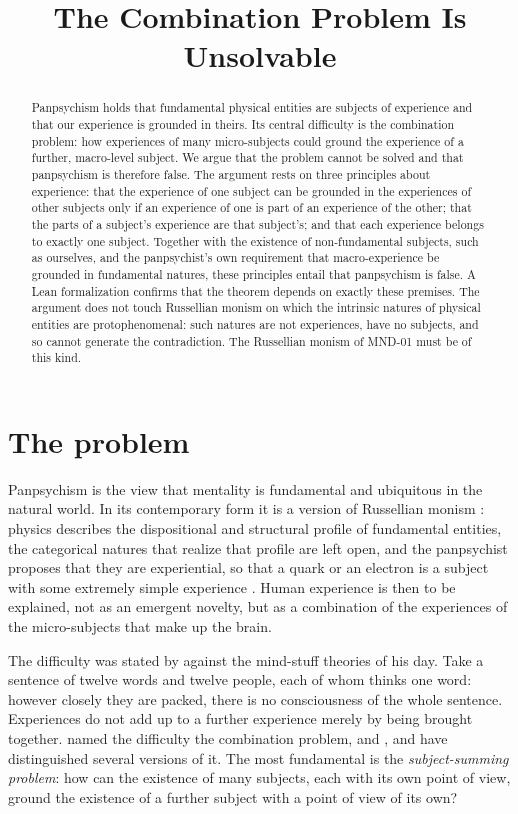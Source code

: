 \documentclass{situationist-preprint}
\title{The Combination Problem Is Unsolvable}
\begin{document}
\maketitle

\begin{abstract}
Panpsychism holds that fundamental physical entities are subjects of experience and that our experience is grounded in theirs. Its central difficulty is the combination problem: how experiences of many micro-subjects could ground the experience of a further, macro-level subject. We argue that the problem cannot be solved and that panpsychism is therefore false. The argument rests on three principles about experience: that the experience of one subject can be grounded in the experiences of other subjects only if an experience of one is part of an experience of the other; that the parts of a subject's experience are that subject's; and that each experience belongs to exactly one subject. Together with the existence of non-fundamental subjects, such as ourselves, and the panpsychist's own requirement that macro-experience be grounded in fundamental natures, these principles entail that panpsychism is false. A Lean formalization confirms that the theorem depends on exactly these premises. The argument does not touch Russellian monism on which the intrinsic natures of physical entities are protophenomenal: such natures are not experiences, have no subjects, and so cannot generate the contradiction. The Russellian monism of MND-01 must be of this kind.
\end{abstract}

\section{The problem}

Panpsychism is the view that mentality is fundamental and ubiquitous in the natural world. In its contemporary form it is a version of Russellian monism \citep{Russell1927}: physics describes the dispositional and structural profile of fundamental entities, the categorical natures that realize that profile are left open, and the panpsychist proposes that they are experiential, so that a quark or an electron is a subject with some extremely simple experience \citep{Strawson2006,Goff2017}. Human experience is then to be explained, not as an emergent novelty, but as a combination of the experiences of the micro-subjects that make up the brain.

The difficulty was stated by \citet[ch.~VI]{James1890} against the mind-stuff theories of his day. Take a sentence of twelve words and twelve people, each of whom thinks one word: however closely they are packed, there is no consciousness of the whole sentence. Experiences do not add up to a further experience merely by being brought together. \citet{Seager1995} named the difficulty the combination problem, and \citet{Goff2009}, \citet{Coleman2014} and \citet{Chalmers2017} have distinguished several versions of it. The most fundamental is the \emph{subject-summing problem}: how can the existence of many subjects, each with its own point of view, ground the existence of a further subject with a point of view of its own?
\end{document}
